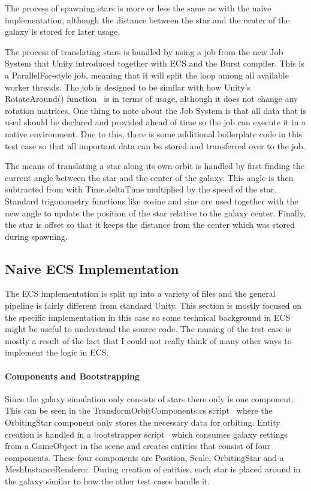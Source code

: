 The process of spawning stars is more or less the same as with the naive implementation, although the distance between the star and the center of the galaxy is stored for later usage. 

The process of translating stars is handled by using a job from the new Job System that Unity introduced together with ECS and the Burst compiler. This is a ParallelFor-style job, meaning that it will split the loop among all available worker threads. The job is designed to be similar with how Unity's RotateAround() function~\cite{rotateAroundFunction} is in terms of usage, although it does not change any rotation matrices. One thing to note about the Job System is that all data that is used should be declared and provided ahead of time so the job can execute it in a native environment. Due to this, there is some additional boilerplate code in this test case so that all important data can be stored and transferred over to the job. 

The means of translating a star along its own orbit is handled by first finding the current angle between the star and the center of the galaxy. This angle is then subtracted from with Time.deltaTime multiplied by the speed of the star. Standard trigonometry functions like cosine and sine are used together with the new angle to update the position of the star relative to the galaxy center. Finally, the star is offset so that it keeps the distance from the center which was stored during spawning. 

\subsection{Naive ECS Implementation}
The ECS implementation is split up into a variety of files and the general pipeline is fairly different from standard Unity. This section is mostly focused on the specific implementation in this case so some technical background in ECS might be useful to understand the source code. The naming of the test case is mostly a result of the fact that I could not really think of many other ways to implement the logic in ECS.

\paragraph{Components and Bootstrapping}
Since the galaxy simulation only consists of stars there only is one component. This can be seen in the TransformOrbitComponents.cs script~\cite{transformOrbitComponent} where the OrbitingStar component only stores the necessary data for orbiting. Entity creation is handled in a bootstrapper script~\cite{bootstrapper} which consumes galaxy settings from a GameObject in the scene and creates entities that consist of four components. These four components are Position, Scale, OrbitingStar and a MeshInstanceRenderer. During creation of entities, each star is placed around in the galaxy similar to how the other test cases handle it. 

